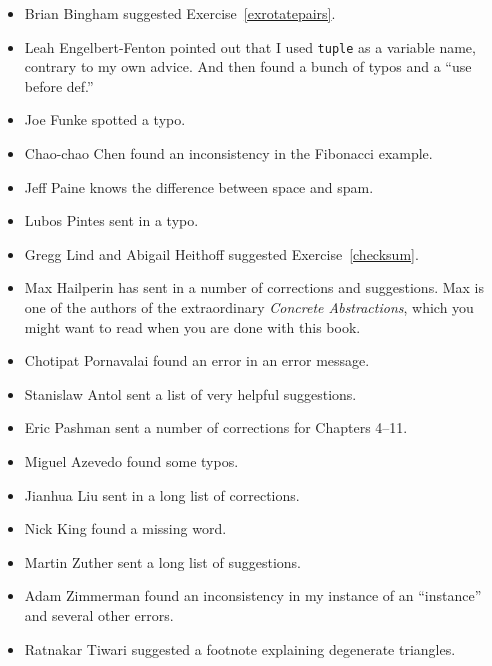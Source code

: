 \documentclass[10pt]{book}
\begin{document}
\begin{itemize}
\item Brian Bingham suggested Exercise~\ref{exrotatepairs}.

\item Leah Engelbert-Fenton pointed out that I used {\tt tuple}
as a variable name, contrary to my own advice.  And then found
a bunch of typos and a ``use before def.''

\item Joe Funke spotted a typo.

\item Chao-chao Chen found an inconsistency in the Fibonacci example.

\item Jeff Paine knows the difference between space and spam.

\item Lubos Pintes sent in a typo.

\item Gregg Lind and Abigail Heithoff suggested Exercise~\ref{checksum}.

\item Max Hailperin has sent in a number of corrections and
  suggestions.  Max is one of the authors of the extraordinary {\em
    Concrete Abstractions}, which you might want to read when you are
  done with this book.

\item Chotipat Pornavalai found an error in an error message.

\item Stanislaw Antol sent a list of very helpful suggestions.

\item Eric Pashman sent a number of corrections for Chapters 4--11.

\item Miguel Azevedo found some typos.

\item Jianhua Liu sent in a long list of corrections.

\item Nick King found a missing word.

\item Martin Zuther sent a long list of suggestions.

\item Adam Zimmerman found an inconsistency in my instance
of an ``instance'' and several other errors.

\item Ratnakar Tiwari suggested a footnote explaining degenerate
triangles.


\end{itemize}
\end{document}
